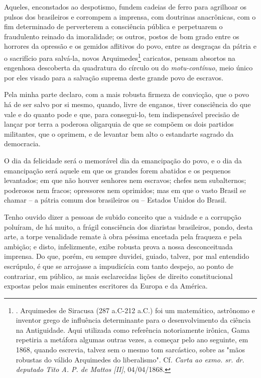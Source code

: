 Aqueles, enconstados ao despotismo, fundem cadeias de ferro para
agrilhoar os pulsos dos brasileiros e corrompem a imprensa, com
doutrinas anacrônicas, com o fim determinado de perverterem a
consciência pública e perpetuarem o fraudulento reinado da imoralidade;
os outros, postos de bom grado entre os horrores da opressão e os
gemidos aflitivos do povo, entre as desgraças da pátria e o sacrifício
para salvá-la, novos Arquimedes\footnote{. Arquimedes de Siracusa (287
  a.C-212 a.C.) foi um matemático, astrônomo e inventor grego de
  influência determinante para o desenvolvimento da ciência na
  Antiguidade. Aqui utilizada como referência notoriamente irônica, Gama
  repetiria a metáfora algumas outras vezes, a começar pelo ano
  seguinte, em 1868, quando escrevia, talvez sem o mesmo tom sarcástico,
  sobre as "mãos robustas do válido Arquimedes do liberalismo". Cf.
  \emph{Carta ao exmo. sr. dr. deputado Tito A. P. de Mattos {[}II{]}},
  04/04/1868.} caricatos, pensam absortos na engenhosa descoberta da
quadratura do círculo ou do \emph{motu-contínuo}, meio único por eles
visado para a salvação suprema deste grande povo de escravos.

Pela minha parte declaro, com a mais robusta firmeza de convicção, que o
povo há de ser salvo por si mesmo, quando, livre de enganos, tiver
consciência do que vale e do quanto pode e que, para consegui-lo, tem
indispensável precisão de lançar por terra a poderosa oligarquia de que
se compõem os dois partidos militantes, que o oprimem, e de levantar bem
alto o estandarte sagrado da democracia.

O dia da felicidade será o memorável dia da emancipação do povo, e o dia
da emancipação será aquele em que os grandes forem abatidos e os
pequenos levantados; em que não houver senhores nem escravos; chefes nem
subalternos; poderosos nem fracos; opressores nem oprimidos; mas em que
o vasto Brasil se chamar -- a pátria comum dos brasileiros ou -- Estados
Unidos do Brasil.

Tenho ouvido dizer a pessoas de subido conceito que a vaidade e a
corrupção poluíram, de há muito, a frágil consciência dos diaristas
brasileiros, pondo, desta arte, a torpe venalidade remate à obra péssima
encetada pela fraqueza e pela ambição; e disto, infelizmente, exibe
robusta prova a nossa desconceituada imprensa. Do que, porém, eu sempre
duvidei, guiado, talvez, por mal entendido escrúpulo, é que se arrojasse
a impudicícia com tanto despejo, ao ponto de contrariar, em público, as
mais esclarecidas lições de direito constitucional expostas pelos mais
eminentes escritores da Europa e da América.

